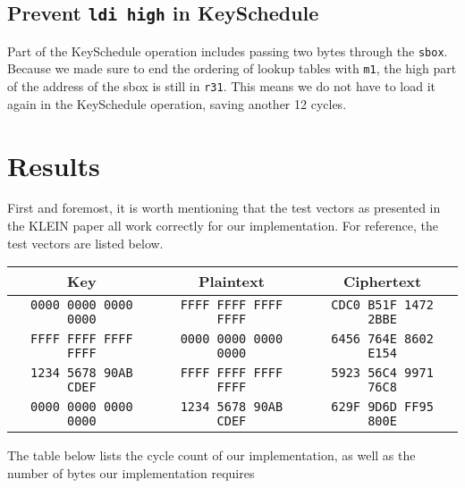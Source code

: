 \documentclass[a4paper]{article}
\begin{document}
\subsection*{Prevent \texttt{ldi high} in KeySchedule}

Part of the KeySchedule operation includes passing two bytes through the \texttt{sbox}. Because we made sure to end the ordering of lookup tables with \texttt{m1}, the high part of the address of the sbox is still in \texttt{r31}. This means we do not have to load it again in the KeySchedule operation, saving another 12 cycles.
\newpage
\section{Results}

First and foremost, it is worth mentioning that the test vectors as presented in the KLEIN paper all work correctly for our implementation. For reference, the test vectors are listed below.

\begin{center}
	\begin{tabular}{c | c | c}
		\hline
		Key & Plaintext & Ciphertext \\
		\hline
	{\tt \small 0000 0000 0000 0000} & {\tt \small FFFF FFFF FFFF FFFF} & {\tt \small CDC0 B51F 1472 2BBE} \\
	{\tt \small FFFF FFFF FFFF FFFF} & {\tt \small 0000 0000 0000 0000} & {\tt \small 6456 764E 8602 E154} \\
	{\tt \small 1234 5678 90AB CDEF} & {\tt \small FFFF FFFF FFFF FFFF} & {\tt \small 5923 56C4 9971 76C8} \\
	{\tt \small 0000 0000 0000 0000} & {\tt \small 1234 5678 90AB CDEF} & {\tt \small 629F 9D6D FF95 800E} \\
		\hline
	\end{tabular}
\end{center}

The table below lists the cycle count of our implementation, as well as the number of bytes our implementation requires %
\end{document}
